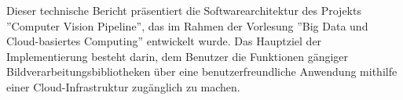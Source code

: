 Dieser technische Bericht präsentiert die Softwarearchitektur des Projekts ''Computer Vision Pipeline'', das im Rahmen der Vorlesung ''Big Data und Cloud-basiertes Computing'' entwickelt wurde. Das Hauptziel der Implementierung besteht darin, dem Benutzer die Funktionen gängiger Bildverarbeitungsbibliotheken über eine benutzerfreundliche Anwendung mithilfe einer Cloud-Infrastruktur zugänglich zu machen. 